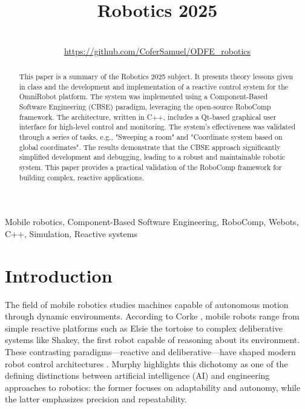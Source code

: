 \documentclass[conference]{IEEEtran}
\begin{document}
\title{Robotics 2025}

\author{%
\\
\url{https://github.com/CoferSamuel/ODFE_robotics}
}

\maketitle
\sloppy

\begin{abstract}
This paper is a summary of the Robotics 2025 subject. It presents theory lessons given in class and the development and implementation of a reactive control system for the OmniRobot platform. The system was implemented using a Component-Based Software Engineering (CBSE) paradigm, leveraging the open-source RoboComp framework. The architecture, written in C++, includes a Qt-based graphical user interface for high-level control and monitoring. The system's effectiveness was validated through a series of tasks, e.g., "Sweeping a room" and "Coordinate system based on global coordinates". The results demonstrate that the CBSE approach significantly simplified development and debugging, leading to a robust and maintainable robotic system. This paper provides a practical validation of the RoboComp framework for building complex, reactive applications.
\end{abstract}

\begin{IEEEkeywords}
Mobile robotics, Component-Based Software Engineering, RoboComp, Webots, C++, Simulation, Reactive systems
\end{IEEEkeywords}

\section{Introduction}
The field of mobile robotics studies machines capable of autonomous motion through dynamic environments. According to Corke \cite{corke2011robotics}, mobile robots range from simple reactive platforms such as Elsie the tortoise to complex deliberative systems like Shakey, the first robot capable of reasoning about its environment. These contrasting paradigms—reactive and deliberative—have shaped modern robot control architectures \cite{brooks1986robust, thrun2005probabilistic}. Murphy \cite{murphy2000introduction} highlights this dichotomy as one of the defining distinctions between artificial intelligence (AI) and engineering approaches to robotics: the former focuses on adaptability and autonomy, while the latter emphasizes precision and repeatability.
\end{document}
